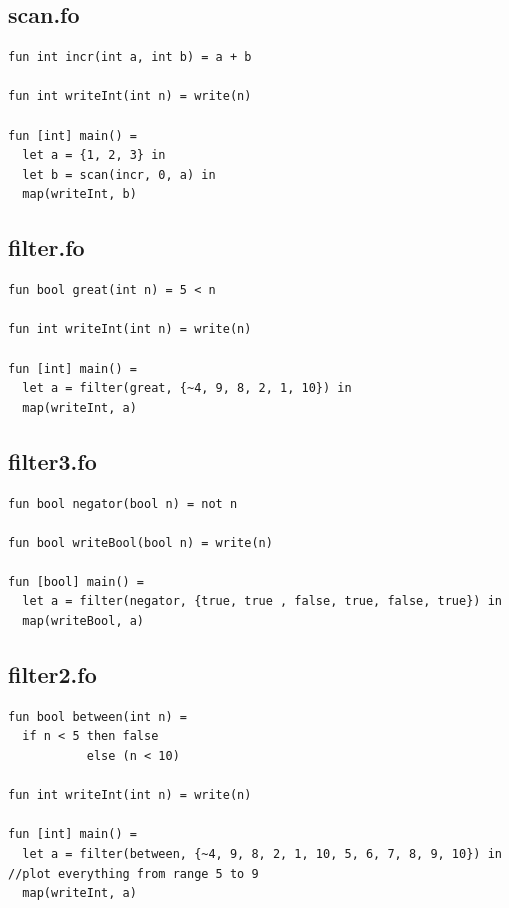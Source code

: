 \documentclass[11pt]{article}
\begin{document}
    \subsection{scan.fo}
    \begin{lstlisting}
fun int incr(int a, int b) = a + b

fun int writeInt(int n) = write(n)

fun [int] main() =
  let a = {1, 2, 3} in
  let b = scan(incr, 0, a) in
  map(writeInt, b)
    \end{lstlisting}

    \subsection{filter.fo}
    \begin{lstlisting}
fun bool great(int n) = 5 < n

fun int writeInt(int n) = write(n)

fun [int] main() =
  let a = filter(great, {~4, 9, 8, 2, 1, 10}) in
  map(writeInt, a)
    \end{lstlisting}

    \subsection{filter3.fo}
    \begin{lstlisting}
fun bool negator(bool n) = not n

fun bool writeBool(bool n) = write(n)

fun [bool] main() =
  let a = filter(negator, {true, true , false, true, false, true}) in
  map(writeBool, a)
    \end{lstlisting}

    \subsection{filter2.fo}
    \begin{lstlisting}
fun bool between(int n) =
  if n < 5 then false
           else (n < 10)

fun int writeInt(int n) = write(n)

fun [int] main() =
  let a = filter(between, {~4, 9, 8, 2, 1, 10, 5, 6, 7, 8, 9, 10}) in //plot everything from range 5 to 9
  map(writeInt, a)
    \end{lstlisting}
\end{document}
